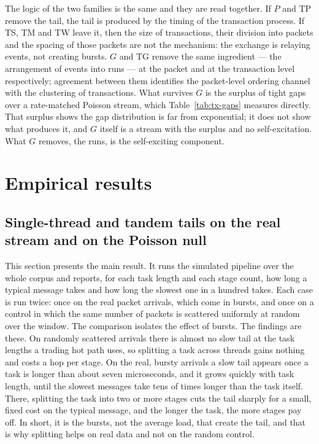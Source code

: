 \documentclass[11pt]{article}
\begin{document}
The logic of the two families is the same and they are read together. If $P$ and \textsf{TP}
remove the tail, the tail is produced by the timing of the transaction process. If \textsf{TS}, \textsf{TM} and \textsf{TW} leave it, then the size of transactions,
their division into packets and the spacing of those packets are not the mechanism: the
exchange is relaying events, not creating bursts. $G$ and \textsf{TG} remove the same ingredient --- the arrangement of events
into runs --- at the packet and at the transaction level respectively; agreement between
them identifies the packet-level ordering channel with the clustering of transactions.
What survives $G$ is the surplus of tight gaps over a rate-matched Poisson
stream, which Table~\ref{tab:tx-gaps} measures directly. That surplus shows the gap
distribution is far from exponential; it does not show what produces it, and $G$ itself is
a stream with the surplus and no self-excitation. What $G$ removes, the runs, is the
self-exciting component.


\section{Empirical results}
\label{sec:results}

\subsection{Single-thread and tandem tails on the real stream and on the Poisson null}
\label{sec:results-tail}

This section presents the main result. It runs the simulated pipeline over the whole
corpus and reports, for each task length and each stage count, how long a typical message
takes and how long the slowest one in a hundred takes. Each case is run twice: once on the
real packet arrivals, which come in bursts, and once on a control in which the same
number of packets is scattered uniformly at random over the window. The comparison
isolates the effect of bursts. The findings
are these. On randomly scattered arrivals there is almost no slow tail at the task lengths a
trading hot path uses, so splitting a task across threads gains nothing and costs a hop per
stage. On the real, bursty arrivals a slow tail appears once a task is longer than about
seven microseconds, and it grows quickly with task length, until the slowest messages
take tens of times longer than the task itself. There, splitting the task into two or
more stages cuts the tail sharply for a small, fixed cost on the typical message, and the
longer the task, the more stages pay off. In short, it is the bursts, not the average
load, that create the tail, and that is why splitting helps on real data and not on the
random control.
\end{document}
